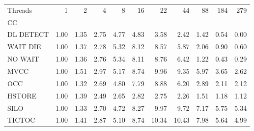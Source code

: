 \begin{tabular}{lrrrrrrrrrr}
\toprule
Threads &  1   &  2   &  4   &  8   &  16  &   22  &   44  &  88  &  184 &  279 \\
CC        &      &      &      &      &      &       &       &      &      &      \\
\midrule
DL DETECT & 1.00 & 1.35 & 2.75 & 4.77 & 4.83 &  3.58 &  2.42 & 1.42 & 0.54 & 0.00 \\
WAIT DIE  & 1.00 & 1.37 & 2.78 & 5.32 & 8.12 &  8.57 &  5.87 & 2.06 & 0.90 & 0.60 \\
NO WAIT   & 1.00 & 1.36 & 2.76 & 5.34 & 8.11 &  8.76 &  6.42 & 1.22 & 0.43 & 0.29 \\
MVCC      & 1.00 & 1.51 & 2.97 & 5.17 & 8.74 &  9.96 &  9.35 & 5.97 & 3.65 & 2.62 \\
OCC       & 1.00 & 1.32 & 2.69 & 4.80 & 7.79 &  8.88 &  6.20 & 2.89 & 2.11 & 2.12 \\
HSTORE    & 1.00 & 1.39 & 2.49 & 2.65 & 2.82 &  2.75 &  2.26 & 1.51 & 1.18 & 1.12 \\
SILO      & 1.00 & 1.33 & 2.70 & 4.72 & 8.27 &  9.97 &  9.72 & 7.17 & 5.75 & 5.34 \\
TICTOC    & 1.00 & 1.41 & 2.87 & 5.10 & 8.74 & 10.34 & 10.43 & 7.98 & 5.64 & 4.99 \\
\bottomrule
\end{tabular}

